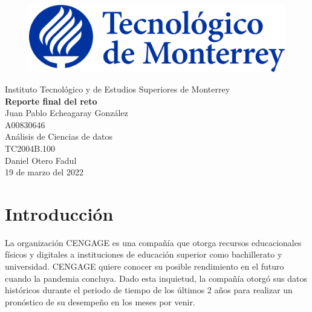 \documentclass{article}
\begin{document}
    \begin{titlepage}
        \begin{center}
            \begin{figure}
                \centering
                \includegraphics[scale=0.13]{logo_itesm.png}\\ %
            \end{figure}
        \vspace{5cm}
        \LARGE{Instituto Tecnológico y de Estudios Superiores de Monterrey}\\
        \fontsize{12}{14}\selectfont
        \vspace{1cm}
        \textbf{Reporte final del reto}\\ %
        \vspace{0.7cm}
        Juan Pablo Echeagaray González\\ %
        \vspace{0.2cm}
        A00830646\\ %
        \vspace{0.7cm}
        Análisis de Ciencias de datos\\ %
        \vspace{0.2cm}
        TC2004B.100\\ %
        \vspace{0.2cm}
        Daniel Otero Fadul\\ %
        \vspace{0.7cm}
        19 de marzo del 2022\\ %
        \end{center}
    \end{titlepage}

    \section{Introducción}
        La organización CENGAGE es una compañía que otorga recursos educacionales físicos y digitales a instituciones de educación superior como bachillerato y universidad. CENGAGE quiere conocer su posible rendimiento en el futuro cuando la pandemia concluya. Dado esta inquietud, la compañía otorgó sus datos históricos durante el periodo de tiempo de los últimos 2 años para realizar un pronóstico de su desempeño en los meses por venir.
\end{document}
